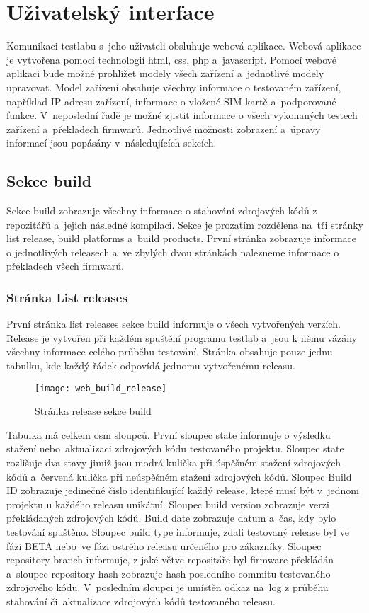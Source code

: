 \chapter{Uživatelský interface}
Komunikaci testlabu s~jeho uživateli obsluhuje webová aplikace. Webová aplikace je vytvořena pomocí technologií html, css, php a~javascript. Pomocí webové aplikaci bude možné prohlížet modely všech zařízení a~jednotlivé modely upravovat. Model zařízení obsahuje všechny informace o testovaném zařízení, například IP adresu zařízení, informace o vložené SIM kartě a~podporované funkce. V~neposlední řadě je možné zjistit informace o všech vykonaných testech zařízení a~překladech firmwarů. Jednotlivé možnosti zobrazení a~úpravy informací jsou popásány v~následujících sekcích.

\section{Sekce build}
Sekce build zobrazuje všechny informace o stahování zdrojových kódů z repozitářů a~jejich následné kompilaci. Sekce je prozatím rozdělena na~tři stránky list release, build platforms a~build products. První stránka zobrazuje informace o jednotlivých releasech a~ve zbylých dvou stránkách nalezneme informace o překladech všech firmwarů.

\subsection{Stránka List releases}
První stránka list releases sekce build informuje o všech vytvořených verzích. Release je vytvořen při každém spuštění programu testlab a~jsou k němu vázány všechny informace celého průběhu testování. Stránka obsahuje pouze jednu tabulku, kde každý řádek odpovídá jednomu vytvořenému releasu.

\begin{figure}[h]
  \centering
  \texttt{[image: web\_build\_release]}
  \caption{Stránka release sekce build}
  \label{fig:web_build_release}
\end{figure}

Tabulka má celkem osm sloupců. První sloupec state informuje o výsledku stažení nebo~aktualizaci zdrojových kódu testovaného projektu. Sloupec state rozlišuje dva stavy jimiž jsou modrá kulička při úspěšném stažení zdrojových kódů a~červená kulička při neúspěšném stažení zdrojových kódů. Sloupec Build ID zobrazuje jedinečné číslo identifikující každý release, které musí být v~jednom projektu u každého releasu unikátní. Sloupec build version zobrazuje verzi překládaných zdrojových kódů. Build date zobrazuje datum a~čas, kdy bylo testování spuštěno. Sloupec build type informuje, zdali testovaný release byl ve fázi BETA nebo~ve fázi ostrého releasu určeného pro zákazníky. Sloupec repository branch informuje, z jaké větve repositáře byl firmware překládán a~sloupec repository hash zobrazuje hash posledního commitu testovaného zdrojového kódu. V~posledním sloupci je umístěn odkaz na~log z průběhu stahování či~aktualizace zdrojových kódů testovaného releasu.


